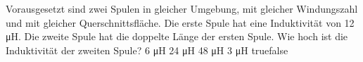     {Vorausgesetzt sind zwei Spulen in gleicher Umgebung, mit gleicher Windungszahl und mit gleicher Querschnittsfläche. Die erste Spule hat eine Induktivität von 12 μH. Die zweite Spule hat die doppelte Länge der ersten Spule. Wie hoch ist die Induktivität der zweiten Spule?}
    {6 μH}
    {24 μH}
    {48 μH}
    {3 μH}
    {true}{false}